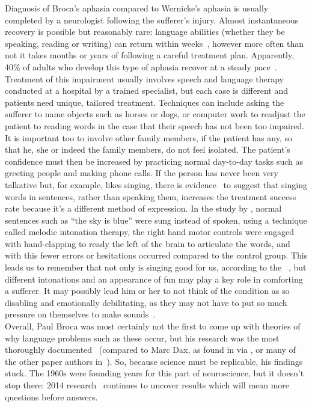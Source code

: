 \documentclass[12pt]{article}
\begin{document}
Diagnosis of Broca's aphasia compared to Wernicke's aphasia is usually
completed by a neurologist following the sufferer's injury. Almost
instantaneous recovery is possible but reasonably rare: language
abilities (whether they be speaking, reading or writing) can return
within weeks~\cite{aphasia-treatment}, however more often than not it
takes months or years of following a careful treatment plan.
Apparently, 40\% of adults who develop this type of aphasia recover at
a steady pace~\cite{gradual-recovery}. Treatment of this impairment
usually involves speech and language therapy conducted at a hospital
by a trained specialist, but each case is different and patients need
unique, tailored treatment. Techniques can include asking the sufferer
to name objects such as horses or dogs, or computer work to readjust
the patient to reading words in the case that their speech has not
been too impaired. It is important too to involve other family
members, if the patient has any, so that he, she or indeed the family
members, do not feel isolated. The patient's confidence must then be
increased by practicing normal day-to-day tasks such as greeting
people and making phone calls. If the person has never been very
talkative but, for example, likes singing, there is
evidence~\cite{singing-recovery} to suggest that singing words in
sentences, rather than speaking them, increases the treatment success
rate because it's a different method of expression. In the study by
\citeauthor{singing-recovery}, normal sentences such as ``the sky is
blue'' were sung instead of spoken, using a technique called melodic
intonation therapy, the right hand motor controls were engaged with
hand-clapping to ready the left of the brain to articulate the words,
and with this fewer errors or hesitations occurred compared to the
control group. This leads us to remember that not only is singing good
for us, according to the \citeauthor{singing-happy}~\cite{singing-happy},
but different intonations and an appearance of fun may play a key role
in comforting a sufferer. It may possibly lead him or her to not think of
the condition as so disabling and emotionally debilitating, as they
may not have to put so much pressure on themselves to make
sounds~\cite{non-fluent-singing}.\\

Overall, Paul Broca was most certainly not the first to come up with
theories of why language problems such as these occur, but his
research was the most thoroughly
documented~\cite{tan-postmortem-imaging} (compared to Marc Dax, as
found in \cite{dax-brocas} via \citeauthor{tan-postmortem-imaging}, or
many of the other paper
authors in~\cite{mit-brocas}). So, because science must be
replicable, his findings stuck. The 1960s were founding years for this
part of neuroscience, but it doesn't stop there: 2014
research~\cite{2014-brocas} continues to uncover results which will
mean more questions before answers.



\end{document}
